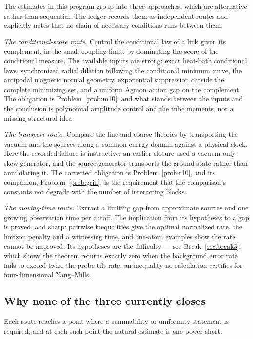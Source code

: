 The estimates in this program group into three approaches, which are
alternative rather than sequential. The ledger records them as
independent routes and explicitly notes that no chain of necessary
conditions runs between them.

\emph{The conditional-score route.} Control the conditional law of a
link given its complement, in the small-coupling limit, by dominating
the score of the conditional measure. The available inputs are strong:
exact heat-bath conditional laws, synchronized radial dilation following
the conditional minimum curve, the antipodal magnetic normal geometry,
exponential suppression outside the complete minimizing set, and a
uniform Agmon action gap on the complement. The obligation is
Problem~\ref{prob:m10}, and what stands between the inputs and the
conclusion is polynomial amplitude control and the tube moments, not a
missing structural idea.

\emph{The transport route.} Compare the fine and coarse theories by
transporting the vacuum and the sources along a common energy domain
against a physical clock. Here the recorded failure is instructive: an
earlier closure used a vacuum-only skew generator, and the source
generator transports the ground state rather than annihilating it. The
corrected obligation is Problem~\ref{prob:r10}, and its companion,
Problem~\ref{prob:grid}, is the requirement that the comparison's
constants not degrade with the number of interacting blocks.

\emph{The moving-time route.} Extract a limiting gap from approximate
sources and one growing observation time per cutoff. The implication
from its hypotheses to a gap is proved, and sharp: pairwise inequalities
give the optimal normalized rate, the horizon penalty and a witnessing
time, and one-atom examples show the rate cannot be improved. Its
hypotheses are the difficulty --- see Break~\ref{sec:break3}, which shows
the theorem returns exactly zero when the background error rate fails to
exceed twice the probe tilt rate, an inequality no calculation certifies
for four-dimensional Yang--Mills.

\subsection{Why none of the three currently closes}

Each route reaches a point where a summability or uniformity statement
is required, and at each such point the natural estimate is one power
short.


